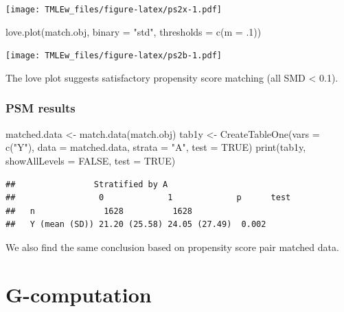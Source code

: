 \documentclass[
]{book}
\newenvironment{Shaded}{\begin{snugshade}}{\end{snugshade}}
\newcommand{\AttributeTok}[1]{\textcolor[rgb]{0.77,0.63,0.00}{#1}}
\newcommand{\ConstantTok}[1]{\textcolor[rgb]{0.00,0.00,0.00}{#1}}
\newcommand{\DecValTok}[1]{\textcolor[rgb]{0.00,0.00,0.81}{#1}}
\newcommand{\FunctionTok}[1]{\textcolor[rgb]{0.00,0.00,0.00}{#1}}
\newcommand{\NormalTok}[1]{#1}
\newcommand{\OtherTok}[1]{\textcolor[rgb]{0.56,0.35,0.01}{#1}}
\newcommand{\StringTok}[1]{\textcolor[rgb]{0.31,0.60,0.02}{#1}}
\begin{document}
\texttt{[image: TMLEw\_files/figure-latex/ps2x-1.pdf]}

\begin{Shaded}
\begin{Highlighting}[]
\FunctionTok{love.plot}\NormalTok{(match.obj, }\AttributeTok{binary =} \StringTok{"std"}\NormalTok{,}
          \AttributeTok{thresholds =} \FunctionTok{c}\NormalTok{(}\AttributeTok{m =}\NormalTok{ .}\DecValTok{1}\NormalTok{))}
\end{Highlighting}
\end{Shaded}

\texttt{[image: TMLEw\_files/figure-latex/ps2b-1.pdf]}

The love plot suggests satisfactory propensity score matching (all SMD \textless{} 0.1).

\hypertarget{psm-results}{%
\subsection{PSM results}\label{psm-results}}

\begin{Shaded}
\begin{Highlighting}[]
\NormalTok{matched.data }\OtherTok{\textless{}{-}} \FunctionTok{match.data}\NormalTok{(match.obj)}
\NormalTok{tab1y }\OtherTok{\textless{}{-}} \FunctionTok{CreateTableOne}\NormalTok{(}\AttributeTok{vars =} \FunctionTok{c}\NormalTok{(}\StringTok{"Y"}\NormalTok{),}
               \AttributeTok{data =}\NormalTok{ matched.data, }\AttributeTok{strata =} \StringTok{"A"}\NormalTok{, }
               \AttributeTok{test =} \ConstantTok{TRUE}\NormalTok{)}
\FunctionTok{print}\NormalTok{(tab1y, }\AttributeTok{showAllLevels =} \ConstantTok{FALSE}\NormalTok{, }
      \AttributeTok{test =} \ConstantTok{TRUE}\NormalTok{) }
\end{Highlighting}
\end{Shaded}

\begin{verbatim}
##                Stratified by A
##                 0             1             p      test
##   n              1628          1628                    
##   Y (mean (SD)) 21.20 (25.58) 24.05 (27.49)  0.002
\end{verbatim}

We also find the same conclusion based on propensity score pair matched data.

\hypertarget{g-computation}{%
\chapter{G-computation}\label{g-computation}}
\end{document}
